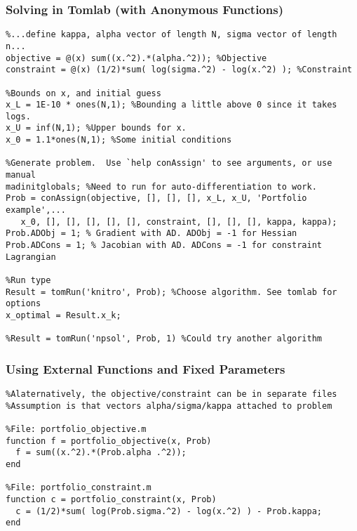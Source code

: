 \documentclass[nofootline]{etk-presentation}
\begin{document}
\begin{frame}[fragile]	\frametitle{Solving in Tomlab (with Anonymous Functions)}
\begin{verbatim}
%...define kappa, alpha vector of length N, sigma vector of length n...
objective = @(x) sum((x.^2).*(alpha.^2)); %Objective
constraint = @(x) (1/2)*sum( log(sigma.^2) - log(x.^2) ); %Constraint

%Bounds on x, and initial guess
x_L = 1E-10 * ones(N,1); %Bounding a little above 0 since it takes logs.
x_U = inf(N,1); %Upper bounds for x.
x_0 = 1.1*ones(N,1); %Some initial conditions

%Generate problem.  Use `help conAssign' to see arguments, or use manual
madinitglobals; %Need to run for auto-differentiation to work.
Prob = conAssign(objective, [], [], [], x_L, x_U, 'Portfolio example',...
   x_0, [], [], [], [], [], constraint, [], [], [], kappa, kappa);
Prob.ADObj = 1; % Gradient with AD. ADObj = -1 for Hessian
Prob.ADCons = 1; % Jacobian with AD. ADCons = -1 for constraint Lagrangian 

%Run type
Result = tomRun('knitro', Prob); %Choose algorithm. See tomlab for options
x_optimal = Result.x_k;

%Result = tomRun('npsol', Prob, 1) %Could try another algorithm

\end{verbatim}
\end{frame}

\begin{frame}[fragile]	\frametitle{Using External Functions and Fixed Parameters}

\begin{verbatim}
%Alaternatively, the objective/constraint can be in separate files
%Assumption is that vectors alpha/sigma/kappa attached to problem

%File: portfolio_objective.m
function f = portfolio_objective(x, Prob)
  f = sum((x.^2).*(Prob.alpha .^2));
end

%File: portfolio_constraint.m
function c = portfolio_constraint(x, Prob)
  c = (1/2)*sum( log(Prob.sigma.^2) - log(x.^2) ) - Prob.kappa;
end
\end{verbatim}	
\end{frame}	
\end{document}
